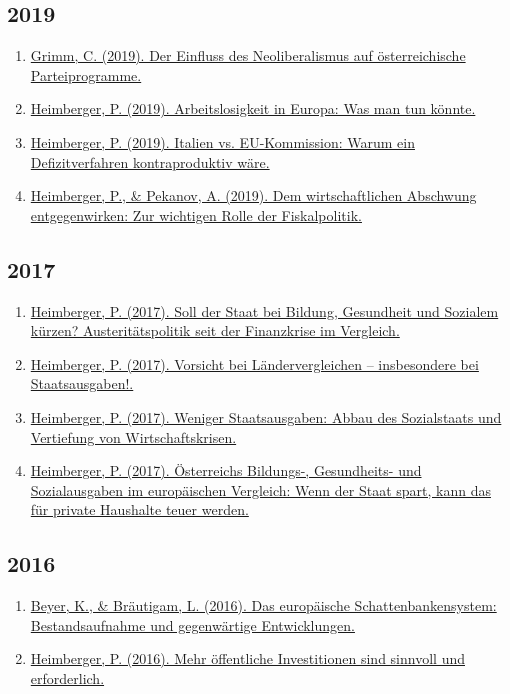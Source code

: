 \subsection*{2019}
\begin{enumerate}
	 \item \href{https://www.awblog.at/Wirtschaft/einfluss-neoliberalismus-parteiprogramme}{Grimm, C. (2019). Der Einfluss des Neoliberalismus auf österreichische Parteiprogramme.}
	 \item \href{https://www.awblog.at/Arbeit/arbeitslosigkeit-in-europa}{Heimberger, P. (2019). Arbeitslosigkeit in Europa: Was man tun könnte.}
	 \item \href{https://www.awblog.at/Europa/italien-defizitverfahren-kontraproduktiv}{Heimberger, P. (2019). Italien vs. EU-Kommission: Warum ein Defizitverfahren kontraproduktiv wäre.}
	 \item \href{https://www.awblog.at/Europa/wirtschaftlichem-abschwung-entgegenwirken}{Heimberger, P., \& Pekanov, A. (2019). Dem wirtschaftlichen Abschwung entgegenwirken: Zur wichtigen Rolle der Fiskalpolitik.}
\end{enumerate}
\subsection*{2017}
\begin{enumerate}
	 \item \href{https://www.awblog.at/Bildung/soll-der-staat-bei-bildung-gesundheit-und-sozialem-kuerzen-aus}{Heimberger, P. (2017). Soll der Staat bei Bildung, Gesundheit und Sozialem kürzen? Austeritätspolitik seit der Finanzkrise im Vergleich.}
	 \item \href{https://www.awblog.at/Bildung/vorsicht-bei-laendervergleichen-insbesondere-bei-staatsausgabe}{Heimberger, P. (2017). Vorsicht bei Ländervergleichen – insbesondere bei Staatsausgaben!.}
	 \item \href{https://www.awblog.at/Allgemein/weniger-staatsausgaben-abbau-des-sozialstaats-und-vertiefung-v}{Heimberger, P. (2017). Weniger Staatsausgaben: Abbau des Sozialstaats und Vertiefung von Wirtschaftskrisen.}
	 \item \href{https://www.awblog.at/Europa/oesterreichs-bildungs-gesundheits-und-sozialausgaben-im-europa}{Heimberger, P. (2017). Österreichs Bildungs-, Gesundheits- und Sozialausgaben im europäischen Vergleich: Wenn der Staat spart, kann das für private Haushalte teuer werden.}
\end{enumerate}
\subsection*{2016}
\begin{enumerate}
	 \item \href{https://www.awblog.at/Allgemein/europaeische-schattenbanken-entwicklungen}{Beyer, K., \& Bräutigam, L. (2016). Das europäische Schattenbankensystem: Bestandsaufnahme und gegenwärtige Entwicklungen.}
	 \item \href{https://www.awblog.at/Wirtschaft/mehr-oeffentliche-investitionen-sind-sinnvoll-und-erforderlich}{Heimberger, P. (2016). Mehr öffentliche Investitionen sind sinnvoll und erforderlich.}
\end{enumerate}
